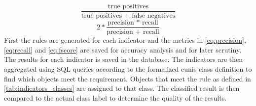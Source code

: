 \documentclass[authoryear,review,12pt,number]{elsarticle}
\begin{document}
\begin{equation}\label{eq:recall}
    \frac{\text{true positives}}{\text{true positives + false negatives}}
\end{equation}
\begin{equation}\label{eq:fscore}
    2 * \frac{\text{precision * recall}}{\text{precision + recall}}
\end{equation}
First the rules are generated for each indicator and the metrics in
\ref{eq:precision}, \ref{eq:recall} and \ref{eq:fscore} are saved for accuracy
analysis and for later scrutiny. The results for each indicator is saved in the
database. The indicators are then aggregated using SQL queries according to the
formalized \gls{eunis} class definition to find which objects meet the 
requirement.
Objects that meet the rule as defined in \ref{tab:indicators_classes} are
assigned to that class. The classified result is then compared to the actual
class label to determine the quality of the results.
\end{document}
